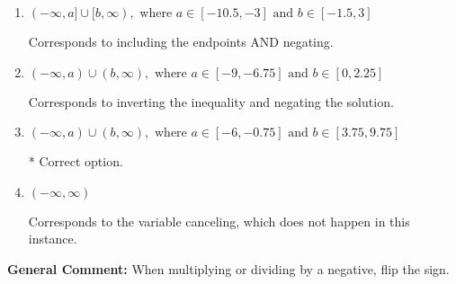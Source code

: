 \documentclass{extbook}[14pt]
\begin{document}
\begin{enumerate}
{\begin{enumerate}[label=\Alph*.]
Corresponds to including the endpoints (when they should be excluded).
\item \( (-\infty, a] \cup [b, \infty), \text{ where } a \in [-10.5, -3] \text{ and } b \in [-1.5, 3] \)

Corresponds to including the endpoints AND negating.
\item \( (-\infty, a) \cup (b, \infty), \text{ where } a \in [-9, -6.75] \text{ and } b \in [0, 2.25] \)

Corresponds to inverting the inequality and negating the solution.
\item \( (-\infty, a) \cup (b, \infty), \text{ where } a \in [-6, -0.75] \text{ and } b \in [3.75, 9.75] \)

 * Correct option.
\item \( (-\infty, \infty) \)

Corresponds to the variable canceling, which does not happen in this instance.
\end{enumerate}

\textbf{General Comment:} When multiplying or dividing by a negative, flip the sign.
}
\end{enumerate}
\end{document}
